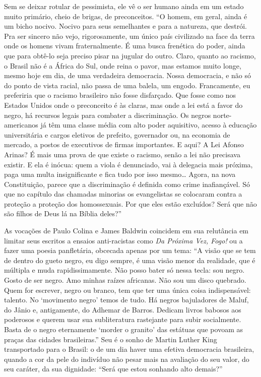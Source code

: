 \documentclass[
  letterpaper,
  DIV=11,
  numbers=noendperiod]{scrreprt}
\begin{document}
Sem se deixar rotular de pessimista, ele vê o ser humano ainda em um
estado muito primário, cheio de brigas, de preconceitos. ``O homem, em
geral, ainda é um bicho nocivo. Nocivo para seus semelhantes e para a
natureza, que destrói. Pra ser sincero não vejo, rigorosamente, um único
país civilizado na face da terra onde os homens vivam fraternalmente. É
uma busca frenética do poder, ainda que para obtê-lo seja preciso pisar
na jugular do outro. Claro, quanto ao racismo, o Brasil não é a África
do Sul, onde reina o pavor, mas estamos muito longe, mesmo hoje em dia,
de uma verdadeira democracia. Nossa democracia, e não só do ponto de
vista racial, não passa de uma balela, um engodo. Francamente, eu
preferiria que o racismo brasileiro não fosse disfarçado. Que fosse como
nos Estados Unidos onde o preconceito é às claras, mas onde a lei está a
favor do negro, há recursos legais para combater a discriminação. Os
negros norte-americanos já têm uma classe média com alto poder
aquisitivo, acesso à educação universitária e cargos eletivos de
prefeito, governador ou, na economia de mercado, a postos de executivos
de firmas importantes. E aqui? A Lei Afonso Arinas? É mais uma prova de
que existe o racismo, senão a lei não precisava existir. E ela é inócua:
quem a viola é denunciado, vai à delegacia mais próxima, paga uma multa
insignificante e fica tudo por isso mesmo\ldots{} Agora, na nova
Constituição, parece que a discriminação é definida como crime
inafiançável. Só que no capítulo das chamadas minorias os evangelistas
se colocaram contra a proteção a proteção dos homossexuais. Por que eles
estão excluídos? Será que não são filhos de Deus lá na Bíblia deles?''

As vocações de Paulo Colina e James Baldwin coincidem em sua relutância
em limitar seus escritos a ensaios anti-racistas como \emph{Da Próxima
Vez, Fogo!} ou a fazer uma poesia panfletária, obcecada apenas por um
tema: ``A visão que se tem de dentro do gueto negro, eu digo sempre, é
uma visão menor da realidade, que é múltipla e muda rapidissimamente.
Não posso bater só nessa tecla: sou negro. Gosto de ser negro. Amo
minhas raízes africanas. Não sou um disco quebrado. Quem for escrever,
negro ou branco, tem que ter uma única coisa indispensável: talento. No
`movimento negro' temos de tudo. Há negros bajuladores de Maluf, do
Jânio e, antigamente, do Adhemar de Barros. Dedicam livros babosos aos
poderosos e querem usar sua subliteratura rastejante para subir
socialmente. Basta de o negro eternamente `morder o granito' das
estátuas que povoam as praças das cidades brasileiras.'' Seu é o sonho
de Martin Luther King transportado para o Brasil: o de um dia haver uma
efetiva democracia brasileira, quando a cor da pele do indivíduo não
pesar mais na avaliação do seu valor, do seu caráter, da sua dignidade:
``Será que estou sonhando alto demais?''
\end{document}
